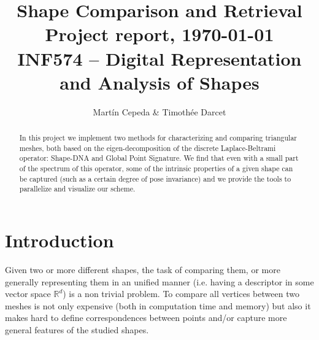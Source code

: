 \documentclass[conference]{IEEEtran}
\begin{document}

\title{Shape Comparison and Retrieval\\
\vspace{10pt}
\normalsize{Project report, \today \\
INF574 -- Digital Representation and Analysis of Shapes}}

\author{Martín Cepeda \& Timothée Darcet}

\author{
\and
{}
}

\maketitle


\begin{abstract}
In this project we implement two methods for characterizing and comparing triangular meshes, both based on the eigen-decomposition of the discrete Laplace-Beltrami operator: Shape-DNA and Global Point Signature. We find that even with a small part of the spectrum of this operator, some of the intrinsic properties of a given shape can be captured (such as a certain degree of pose invariance) and we provide the tools to parallelize and visualize our scheme.
\vspace*{10pt}
\end{abstract}


\section{Introduction}
Given two or more different shapes, the task of comparing them, or more generally representing them in an unified manner (i.e. having a descriptor in some vector space $\mathbb{R}^d$) is a non trivial problem. To compare all vertices between two meshes is not only expensive (both in computation time and memory) but also it makes hard to define correspondences between points and/or capture more general features of the studied shapes.
\end{document}
